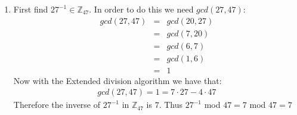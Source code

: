 \begin{enumerate}

\item First find $27^{-1} \in \mathbb{Z}_{47}$. In order to do this we need $gcd(27,47)$:
\begin{eqnarray*}
    gcd(27,47) &=& gcd(20,27) \\
    &=& gcd(7,20) \\
    &=& gcd(6,7) \\
    &=& gcd(1,6) \\
    &=& 1
\end{eqnarray*}
Now with the Extended division algorithm we have that:
\begin{eqnarray*}
    gcd(27,47) = 1 = 7 \cdot 27 - 4 \cdot 47
\end{eqnarray*}
Therefore the inverse of $27^{-1}$ in $\mathbb{Z}_{47}$ is $7$.
Thus $27^{-1}$ mod $47 = 7$ mod $47 = 7$ 

\end{enumerate}